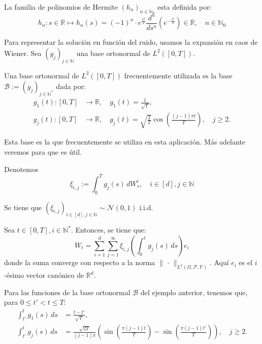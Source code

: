 \begin{defn}
  La familia de polinomios de Hermite $(h_n)_{n \in \mathbb{N}_0}$ esta definida por:
  $$
  h_n: s\in \mathbb{R} \mapsto h_n(s) = (-1)^n\cdot e^{\frac{s^2}{2}} \frac{d^n}{d s^n}(e^{-\frac{s^2}{2}}) \in \mathbb{R},\quad n \in \mathbb{N}_0
  $$
\end{defn}

Para representar la solución en función del ruido, usamos la expansión en caos de Wiener. Sea $\left(g_j\right)_{j \in \mathbb{N}}$ una base ortonormal de $L^2([0,T])$.

\begin{ej}
  Una base ortonormal de $L^2([0,T])$ frecuentemente utilizada es la base $\mathcal{B} := (g_j)_{j \in \mathbb{N}^{*}}$ dada por:
  \[
    \begin{aligned}
      g_1(t): [0, T] &\to \mathbb{R}, \quad g_1(t) = \frac{1}{\sqrt{T}}, \\
      g_j(t): [0, T] &\to \mathbb{R}, \quad g_j(t) = \sqrt{\frac{2}{T}} \cos\left(\frac{(j - 1)\pi t}{T}\right), \quad j \geq 2.
    \end{aligned}
  \]
\end{ej}

Esta base es la que frecuentemente se utiliza en esta aplicación. Más adelante veremos para que es útil.

\begin{nota}[]
  Denotemos
  \begin{equation}
    \xi_{i,j} := \int_0^T g_j(s) \, dW^{i}_s, \quad i \in [d], j \in \mathbb{N}
  \end{equation}
\end{nota}

\begin{prop}[]
  Se tiene que $(\xi_{i,j})_{i\in [d],j\in \mathbb{N}} \sim \mathcal{N}(0, 1)$ i.i.d.
\end{prop}

\begin{lema}[]
  Sea $t \in [0, T], i \in \mathbb{N}^{*}$. Entonces, se tiene que:
  \[
    W_t = \sum_{i=1}^{d} \sum_{j=1}^{\infty} \xi_{i,j} \left(\int_0^t g_j(s) \, ds \right)e_i
  \]
  donde la suma converge con respecto a la norma $\|\, \cdot\,\|_{L^2(\Omega, \mathcal{F}, \mathbb{P})}$. Aquí $e_i$ es el $i$-ésimo vector canónico de $\mathbb{R}^d$.
\end{lema}

\begin{ej}[]
  Para las funciones de la base ortonormal $\mathcal{B}$ del ejemplo anterior, tenemos que, para $0\leq t'<t \leq T$:
  \[
    \begin{aligned}
      \int_{t'}^t g_1(s) \, ds &= \frac{t - t'}{\sqrt{T}}, \\
      \int_{t'}^t g_j(s)\, ds &= \frac{\sqrt{2T}}{(j-1)\pi}\left( \sin \left( \frac{\pi(j-1)t}{T} \right) - \sin\left( \frac{\pi(j-1)t'}{T} \right) \right), \quad j \geq 2.
    \end{aligned}
  \]
\end{ej}


